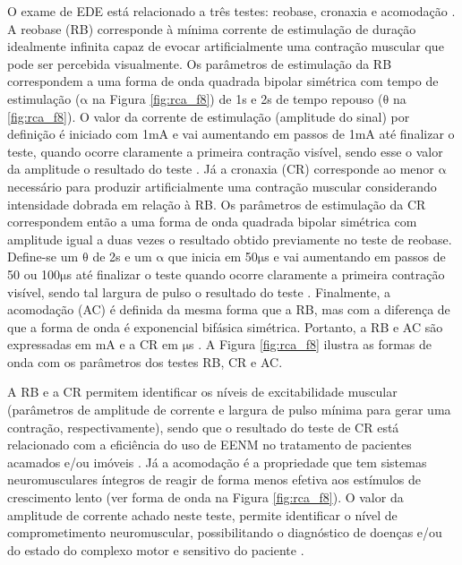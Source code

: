 O exame de \acrshort{EDE} está relacionado a três testes: reobase, cronaxia e acomodação \cite{Russo2004AlteracoesEletroestimulacao}. A reobase (\acrshort{RB}) corresponde à mínima corrente de estimulação de duração idealmente infinita capaz de evocar artificialmente uma contração muscular que pode ser percebida visualmente. Os parâmetros de estimulação da \acrshort{RB} correspondem a uma forma de onda quadrada bipolar simétrica com tempo de estimulação ($\mathrm{\alpha}$ na Figura \ref{fig:rca_f8}) de 1s e 2s de tempo repouso ($\mathrm{\theta}$ na \ref{fig:rca_f8}). O valor da corrente de estimulação (amplitude do sinal) por definição é iniciado com 1mA e vai aumentando em passos de 1mA até finalizar o teste, quando ocorre claramente a primeira contração visível, sendo esse o valor da amplitude o resultado do teste \cite{Irnich2010TheOld, Pieber2015OptimizingStudy}. Já a cronaxia (\acrshort{CR}) corresponde ao menor $\mathrm{\alpha}$ necessário para produzir artificialmente uma contração muscular considerando intensidade dobrada em relação à \acrshort{RB}. Os parâmetros de estimulação da \acrshort{CR} correspondem então a uma forma de onda quadrada bipolar simétrica com amplitude igual a duas vezes o resultado obtido previamente no teste de reobase. Define-se um $\mathrm{\theta}$ de 2s e um $\mathrm{\alpha}$ que inicia em 50$\mathrm{\mu}$s e vai aumentando em passos de 50 ou 100$\mathrm{\mu}$s até finalizar o teste quando ocorre claramente a primeira contração visível, sendo tal largura de pulso o resultado do teste \cite{Irnich2010TheOld, Pieber2015OptimizingStudy}. Finalmente, a acomodação (\acrshort{AC}) é definida da mesma forma que a \acrshort{RB}, mas com a diferença de que a forma de onda é exponencial bifásica simétrica. Portanto, a \acrshort{RB} e \acrshort{AC} são expressadas em mA e a \acrshort{CR} em $\mathrm{\mu}$s \cite{Russo2004AlteracoesEletroestimulacao}. A Figura \ref{fig:rca_f8} ilustra as formas de onda com os parâmetros dos testes \acrshort{RB}, \acrshort{CR} e \acrshort{AC}. 

A \acrshort{RB} e a \acrshort{CR} permitem identificar os níveis de excitabilidade muscular (parâmetros de amplitude de corrente e largura de pulso mínima para gerar uma contração, respectivamente), sendo que o resultado do teste de \acrshort{CR} está relacionado com a eficiência do uso de \acrshort{EENM} no tratamento de pacientes acamados e/ou imóveis \cite{Naki2011IsParameters, Martin2014PracticasFisioterapia}. Já a acomodação é a propriedade que tem sistemas neuromusculares íntegros de reagir de forma menos efetiva aos estímulos de crescimento lento (ver forma de onda na Figura \ref{fig:rca_f8}). O valor da amplitude de corrente achado neste teste, permite identificar o nível de comprometimento neuromuscular, possibilitando o diagnóstico de doenças e/ou do estado do complexo motor e sensitivo do paciente \cite{Sabater2012EfeitoRatos}.

